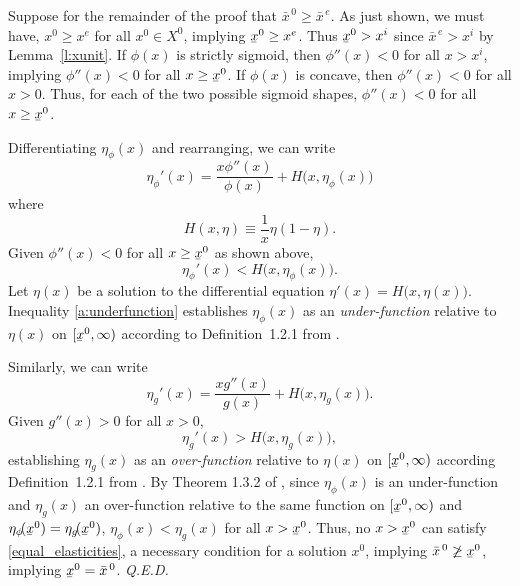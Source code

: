 \documentclass[12pt]{article}
\newcommand{\lowerbar}[1]{\underaccent{\bar}{#1}}
\renewcommand{\qed}{{\it Q.E.D.}}
\newcommand{\efficacy}{\phi}
\newcommand{\general}{g}
\newcommand{\xunit}{x^{e}}
\newcommand{\xunitbar}{\bar{x}^{\,e}}
\newcommand{\xpoi}{x^{i}}
\newcommand{\xno}{x^{0}}
\newcommand{\Xno}{X^{0}}
\newcommand{\xnobar}{\bar{x}^{\,0}}
\newcommand{\xnolbar}{\lowerbar{x}^0}
\newcommand{\elasticity}[1]{\eta_{#1}}
\begin{document}
Suppose for the remainder of the proof that $\xnobar \geq
\xunitbar$. As just shown, we must have, $\xno \geq \xunit$ for all
$\xno \in \Xno$, implying $\xnolbar \geq \xunit$. Thus $\xnolbar >
\xpoi$ since $\xunitbar > \xpoi$ by Lemma~\ref{l:xunit}. If
$\efficacy(x)$ is strictly sigmoid, then $\efficacy''(x) < 0$ for all
$x > \xpoi$, implying $\efficacy''(x) < 0$ for all $x \geq
\xnolbar$. If $\efficacy(x)$ is concave, then $\efficacy''(x) < 0$ for
all $x > 0$. Thus, for each of the two possible sigmoid shapes,
$\efficacy''(x) < 0$ for all $x \geq \xnolbar$.

Differentiating $\elasticity{\efficacy}\!(x)$ and rearranging, we can
write
\begin{equation}
\label{a:deriv_elasticity_efficacy_H}
\elasticity{\efficacy}'\!(x) = \frac{x\efficacy''(x)}{\efficacy(x)} +
H \bigl( x,\elasticity{\efficacy}\!(x) \bigr)
\end{equation}
where
\begin{equation}
\label{a:H}
H(x,\eta) \equiv \frac{1}{x}\eta (1-\eta).
\end{equation}
Given $\efficacy''(x) < 0$ for all $x \geq \xnolbar$ as shown above, 
\begin{equation}
\label{a:underfunction}
\elasticity{\efficacy}'\!(x) < H \bigl( x, \elasticity{\efficacy}\!(x)
\bigr).
\end{equation} 
Let $\eta(x)$ be a solution to the differential equation $\eta'(x) = H
\bigl( x, \eta(x) \bigr)$. Inequality \eqref{a:underfunction}
establishes $\elasticity{\efficacy}\!(x)$ as an {\em under-function}
relative to $\eta(x)$ on $[\xnolbar, \infty)$ according to
  Definition~1.2.1 from \citet{Lakshmikantham1969}.

Similarly, we can write
\begin{equation}
\label{a:deriv_elasticity_general_H}
\elasticity{\general}'\!(x) = \frac{x\general''(x)}{\general(x)} + H
\bigl( x,\elasticity{\general}\!(x) \bigr).
\end{equation}
Given $\general''(x) > 0$ for all $x > 0$, 
\begin{equation}
\label{a:overfunction}
\elasticity{\general}'\!(x) > H \bigl( x, \elasticity{\general}(x)
\bigr),
\end{equation} 
establishing $\elasticity{\general}\!(x)$ as an {\em over-function}
relative to $\eta(x)$ on $[\xnolbar, \infty)$ according
  Definition~1.2.1 from \citet{Lakshmikantham1969}.  By Theorem 1.3.2
  of \citet{Lakshmikantham1969}, since $\elasticity{\efficacy}\!(x)$
  is an under-function and $\elasticity{\general}\!(x)$ an
  over-function relative to the same function on $[\xnolbar,\infty)$
    and $\elasticity{\efficacy}\!(\xnolbar) =
    \elasticity{\general}\!(\xnolbar)$, $\elasticity{\efficacy}\!(x) <
    \elasticity{\general}\!(x)$ for all $x > \xnolbar$. Thus, no $x >
    \xnolbar$ can satisfy \eqref{equal_elasticities}, a necessary
    condition for a solution $\xno$, implying $\xnobar \not\geq
    \xnolbar$, implying $\xnolbar = \xnobar$. \qed
\end{document}

